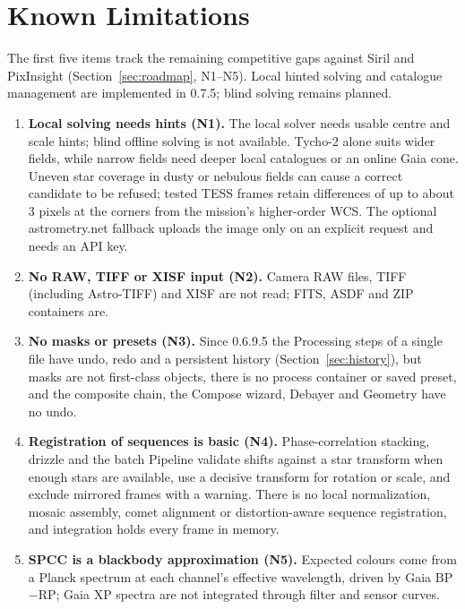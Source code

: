 \documentclass[11pt,a4paper]{article}
\begin{document}
    \section{Known Limitations}
    \label{sec:limitations}

    The first five items track the remaining competitive gaps against Siril and PixInsight (Section~\ref{sec:roadmap}, N1--N5). Local hinted solving and catalogue management are implemented in 0.7.5; blind solving remains planned.

    \begin{enumerate}[nosep]
    \item \textbf{Local solving needs hints (N1).} The local solver needs usable centre and scale hints; blind offline solving is not available. Tycho-2 alone suits wider fields, while narrow fields need deeper local catalogues or an online Gaia cone. Uneven star coverage in dusty or nebulous fields can cause a correct candidate to be refused; tested TESS frames retain differences of up to about 3 pixels at the corners from the mission's higher-order WCS. The optional astrometry.net fallback uploads the image only on an explicit request and needs an API key.
    \item \textbf{No RAW, TIFF or XISF input (N2).} Camera RAW files, TIFF (including Astro-TIFF) and XISF are not read; FITS, ASDF and ZIP containers are.
    \item \textbf{No masks or presets (N3).} Since 0.6.9.5 the Processing steps of a single file have undo, redo and a persistent history (Section~\ref{sec:history}), but masks are not first-class objects, there is no process container or saved preset, and the composite chain, the Compose wizard, Debayer and Geometry have no undo.
    \item \textbf{Registration of sequences is basic (N4).} Phase-correlation stacking, drizzle and the batch Pipeline validate shifts against a star transform when enough stars are available, use a decisive transform for rotation or scale, and exclude mirrored frames with a warning. There is no local normalization, mosaic assembly, comet alignment or distortion-aware sequence registration, and integration holds every frame in memory.
    \item \textbf{SPCC is a blackbody approximation (N5).} Expected colours come from a Planck spectrum at each channel's effective wavelength, driven by Gaia BP$-$RP; Gaia XP spectra are not integrated through filter and sensor curves.

\end{enumerate}
\end{document}
